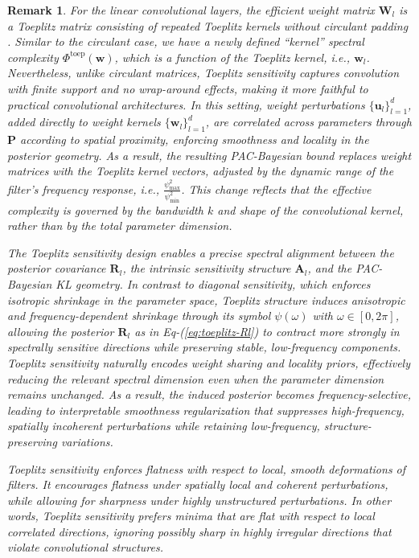 \documentclass[journal]{IEEEtran} %
\def\eqref#1{Eq-(\ref{#1})}
\newtheorem{remark}{Remark}%
\def\vu{{\bm{u}}}
\def\vw{{\bm{w}}}
\def\mA{{\bm{A}}}
\def\mP{{\bm{P}}}
\def\mR{{\bm{R}}}
\def\mW{{\bm{W}}}
\begin{document}
\begin{remark} \upshape
For the linear convolutional layers, the efficient weight matrix $\mW_l$ is a Toeplitz matrix consisting of repeated Toeplitz kernels without circulant padding \cite{yi2022asymptotic,Wang_2020_CVPR}.
Similar to the circulant case, we have a newly defined ``kernel'' spectral complexity ${\Phi}^{\mathrm{toep}}(\vw)$, which is a function of the Toeplitz kernel, i.e., $\vw_l$.
Nevertheless, unlike circulant matrices, Toeplitz sensitivity captures convolution with finite support and no wrap-around effects, making it more faithful to practical convolutional architectures. In this setting, weight perturbations $\{\vu_l\}_{l=1}^d$, added directly to weight kernels $\{\vw_l\}_{l=1}^d$, are correlated across parameters through $\mP$ according to spatial proximity, enforcing smoothness and locality in the posterior geometry. As a result, the resulting PAC-Bayesian bound replaces weight matrices with the Toeplitz kernel vectors, adjusted by the dynamic range of the filter’s frequency response, i.e., $\frac{\psi_{\max}^2}{\psi_{\min}^2}$.
This change reflects that the effective complexity is governed by the bandwidth $k$ and shape of the convolutional kernel, rather than by the total parameter dimension.

The Toeplitz sensitivity design enables a precise spectral alignment between the posterior covariance $\mR_l$, the intrinsic sensitivity structure $\mA_l$, and the PAC-Bayesian KL geometry. In contrast to diagonal sensitivity, which enforces isotropic shrinkage in the parameter space, Toeplitz structure induces anisotropic and frequency-dependent shrinkage through its symbol $\psi(\omega)$ with $\omega \in [0,2\pi]$, allowing the posterior $\mR_l$ as in \eqref{eq:toeplitz-Rl} to contract more strongly in spectrally sensitive directions while preserving stable, low-frequency components. 
Toeplitz sensitivity naturally encodes weight sharing and locality priors, effectively reducing the relevant spectral dimension even when the parameter dimension remains unchanged. As a result, the induced posterior becomes frequency-selective, leading to interpretable smoothness regularization that suppresses high-frequency, spatially incoherent perturbations while retaining low-frequency, structure-preserving variations. 
% 

Toeplitz sensitivity enforces flatness with respect to local, smooth deformations of filters. It encourages flatness under spatially local and coherent perturbations, while allowing for sharpness under highly unstructured perturbations.
In other words, Toeplitz sensitivity prefers minima that are flat with respect to local correlated directions, ignoring possibly sharp in highly irregular directions that violate convolutional structures.
\end{remark}
\end{document}
